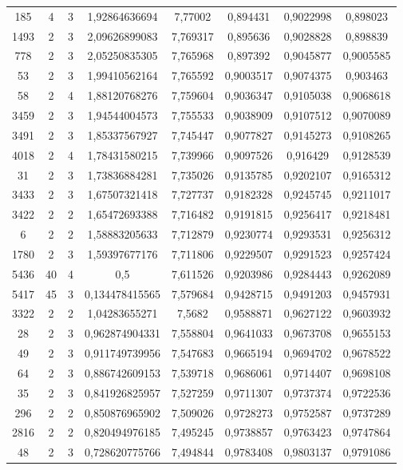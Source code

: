 \begin{longtable}{|c|c|c|c|c|c|c|c|}
185 & 4 & 3 & 1,92864636694 & 7,77002 & 0,894431 & 0,9022998 & 0,898023 \\
1493 & 2 & 3 & 2,09626899083 & 7,769317 & 0,895636 & 0,9028828 & 0,898839 \\
778 & 2 & 3 & 2,05250835305 & 7,765968 & 0,897392 & 0,9045877 & 0,9005585 \\
53 & 2 & 3 & 1,99410562164 & 7,765592 & 0,9003517 & 0,9074375 & 0,903463 \\
58 & 2 & 4 & 1,88120768276 & 7,759604 & 0,9036347 & 0,9105038 & 0,9068618 \\
3459 & 2 & 3 & 1,94544004573 & 7,755533 & 0,9038909 & 0,9107512 & 0,9070089 \\
3491 & 2 & 3 & 1,85337567927 & 7,745447 & 0,9077827 & 0,9145273 & 0,9108265 \\
4018 & 2 & 4 & 1,78431580215 & 7,739966 & 0,9097526 & 0,916429 & 0,9128539 \\
31 & 2 & 3 & 1,73836884281 & 7,735026 & 0,9135785 & 0,9202107 & 0,9165312 \\
3433 & 2 & 3 & 1,67507321418 & 7,727737 & 0,9182328 & 0,9245745 & 0,9211017 \\
3422 & 2 & 2 & 1,65472693388 & 7,716482 & 0,9191815 & 0,9256417 & 0,9218481 \\
6 & 2 & 2 & 1,58883205633 & 7,712879 & 0,9230774 & 0,9293531 & 0,9256312 \\
1780 & 2 & 3 & 1,59397677176 & 7,711806 & 0,9229507 & 0,9291523 & 0,9257424 \\
5436 & 40 & 4 & 0,5 & 7,611526 & 0,9203986 & 0,9284443 & 0,9262089 \\
5417 & 45 & 3 & 0,134478415565 & 7,579684 & 0,9428715 & 0,9491203 & 0,9457931 \\
3322 & 2 & 2 & 1,04283655271 & 7,5682 & 0,9588871 & 0,9627122 & 0,9603932 \\
28 & 2 & 3 & 0,962874904331 & 7,558804 & 0,9641033 & 0,9673708 & 0,9655153 \\
49 & 2 & 3 & 0,911749739956 & 7,547683 & 0,9665194 & 0,9694702 & 0,9678522 \\
64 & 2 & 3 & 0,886742609153 & 7,539718 & 0,9686061 & 0,9714407 & 0,9698108 \\
35 & 2 & 3 & 0,841926825957 & 7,527259 & 0,9711307 & 0,9737374 & 0,9722536 \\
296 & 2 & 2 & 0,850876965902 & 7,509026 & 0,9728273 & 0,9752587 & 0,9737289 \\
2816 & 2 & 2 & 0,820494976185 & 7,495245 & 0,9738857 & 0,9763423 & 0,9747864 \\
48 & 2 & 3 & 0,728620775766 & 7,494844 & 0,9783408 & 0,9803137 & 0,9791086 \\

\end{longtable}
